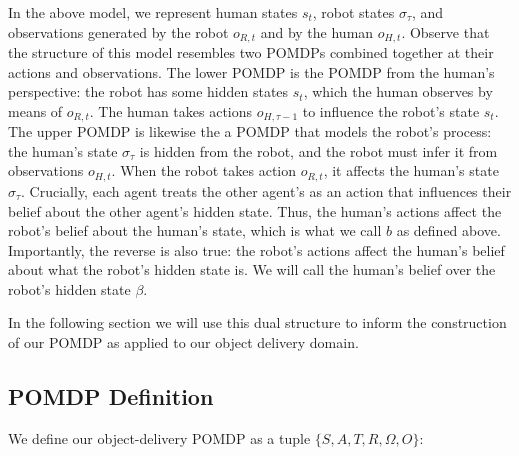 \documentclass{article}
\begin{document}
In the above model, we represent human states $s_t$, robot states $\sigma_\tau$, and observations generated by the robot $o_{R,t}$ and by the human $o_{H,t}$. Observe that the structure of this model resembles two POMDPs combined together at their actions and observations. The lower POMDP is the POMDP from the human's perspective: the robot has some hidden states $s_t$, which the human observes by means of $o_{R,t}$. The human takes actions $o_{H, \tau - 1}$ to influence the robot's state $s_t$. The upper POMDP is likewise the a POMDP that models the robot's process: the human's state $\sigma_\tau$ is hidden from the robot, and the robot must infer it from observations $o_{H, t}$. When the robot takes action $o_{R, t}$, it affects the human's state $\sigma_\tau$. Crucially, each agent treats the other agent's as an action that influences their belief about the other agent's hidden state. Thus, the human's actions affect the robot's belief about the human's state, which is what we call $b$ as defined above. Importantly, the reverse is also true: the robot's actions affect the human's belief about what the robot's hidden state is. We will call the human's belief over the robot's hidden state $\beta$. 


In the following section we will use this dual structure to inform the construction of our POMDP as applied to our object delivery domain. 


\subsection{POMDP Definition}

We define our object-delivery POMDP as a tuple $\{S, A, T, R, \Omega, O\}$: 
\end{document}
